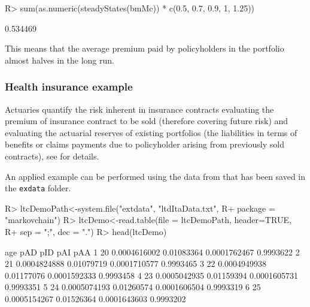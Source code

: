 \documentclass[
  nojss]{jss}
\begin{document}
\begin{CodeChunk}

\begin{CodeInput}
R> sum(as.numeric(steadyStates(bmMc)) * c(0.5, 0.7, 0.9, 1, 1.25))
\end{CodeInput}

\begin{CodeOutput}
[1] 0.534469
\end{CodeOutput}
\end{CodeChunk}

This means that the average premium paid by policyholders in the portfolio almost halves in the long run.

\hypertarget{sec:hi}{%
\subsubsection{Health insurance example}\label{sec:hi}}

Actuaries quantify the risk inherent in insurance contracts evaluating the premium of insurance contract to be sold (therefore covering future risk) and evaluating the actuarial reserves of existing portfolios (the liabilities in terms of benefits or claims payments due to policyholder arising from previously sold contracts), see \cite{deshmukh2012multiple} for details.

An applied example can be performed using the data from \cite{de2016assicurazioni} that has been saved in the \texttt{exdata} folder.

\begin{CodeChunk}

\begin{CodeInput}
R> ltcDemoPath<-system.file("extdata", "ltdItaData.txt", 
R+                          package = "markovchain")
R> ltcDemo<-read.table(file = ltcDemoPath, header=TRUE, 
R+                     sep = ";", dec = ".")
R> head(ltcDemo)
\end{CodeInput}

\begin{CodeOutput}
  age          pAD        pID          pAI       pAA
1  20 0.0004616002 0.01083364 0.0001762467 0.9993622
2  21 0.0004824888 0.01079719 0.0001710577 0.9993465
3  22 0.0004949938 0.01177076 0.0001592333 0.9993458
4  23 0.0005042935 0.01159394 0.0001605731 0.9993351
5  24 0.0005074193 0.01260574 0.0001606504 0.9993319
6  25 0.0005154267 0.01526364 0.0001643603 0.9993202
\end{CodeOutput}
\end{CodeChunk}
\end{document}
